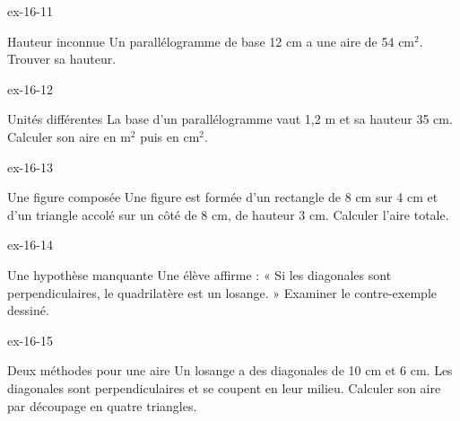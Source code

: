 \begin{blocLivre}{ex-16-11}\begin{exercice}[3]{Hauteur inconnue}
Un parallélogramme de base 12 cm a une aire de 54 cm$^2$. Trouver sa hauteur.
\label{fig-ex-16-11}
\end{exercice}\end{blocLivre}
\begin{blocLivre}{ex-16-12}\begin{exercice}[3]{Unités différentes}
La base d’un parallélogramme vaut 1,2 m et sa hauteur 35 cm. Calculer son aire en m$^2$ puis en cm$^2$.
\label{fig-ex-16-12}
\end{exercice}\end{blocLivre}
\begin{blocLivre}{ex-16-13}\begin{exercice}[3]{Une figure composée}
Une figure est formée d’un rectangle de 8 cm sur 4 cm et d’un triangle accolé sur un côté de 8 cm, de hauteur 3 cm. Calculer l’aire totale.
\label{fig-ex-16-13}
\end{exercice}\end{blocLivre}
\begin{blocLivre}{ex-16-14}\begin{exercice}[3]{Une hypothèse manquante}
Une élève affirme : « Si les diagonales sont perpendiculaires, le quadrilatère est un losange. » Examiner le contre-exemple dessiné.
\label{fig-ex-16-14}
\end{exercice}\end{blocLivre}
\begin{blocLivre}{ex-16-15}\begin{exercice}[3]{Deux méthodes pour une aire}
Un losange a des diagonales de 10 cm et 6 cm. Les diagonales sont perpendiculaires et se coupent en leur milieu. Calculer son aire par découpage en quatre triangles.
\label{fig-ex-16-15}
\end{exercice}\end{blocLivre}

\clearpage
